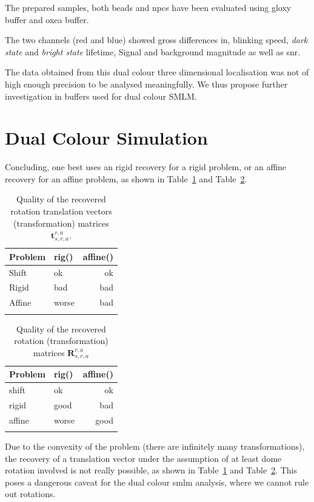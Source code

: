 \documentclass[11pt, a4paper, oneside, twocolumn]{report}
\renewcommand{\b}{\textbf}
\newcommand{\e}{\emph}
\begin{document}
The prepared samples, both beads and \gls{npc}s have been evaluated
using \gls{gloxy} buffer and \gls{oxea} buffer.

The two channels (red and blue) showed gross differences in, blinking
speed, \e{dark state} and \e{bright state} lifetime, Signal and
background magnitude as well as \gls{snr}.

The data obtained from this dual colour three dimensional localisation
was not of high enough precision to be analysed meaningfully. We thus
propose further investigation in buffers used for dual colour SMLM.
  

\section{Dual Colour Simulation}

Concluding, one best uses an rigid recovery for a rigid problem, or an
affine recovery for an affine problem, as shown in Table~\ref{t:t} and
Table~\ref{t:r}.

\begin{table}[!htb]
  \caption{Quality of the recovered rotation translation vectors
    (transformation) matrices $\b{t}_{s,r,a}^{r,a}$.}\label{t:t}
  \begin{tabularx}{.5\textwidth}{X l r}
    \hhline{===}
    Problem & rig() & affine() \\
    \hline
    Shift & ok & ok \\
    Rigid & bad & bad \\
    Affine & worse & bad \\
    \hhline{===}
  \end{tabularx}
\end{table}

\begin{table}[!htb]
  \caption{Quality of the recovered rotation (transformation) matrices
    $\b{R}_{s,r,a}^{r,a}$}\label{t:r}
  \begin{tabularx}{.5\textwidth}{X l r}
    \hhline{===}
    Problem & rig() & affine() \\
    \hline
    shift & ok & ok \\
    rigid & good & bad \\
    affine & worse & good \\
    \hhline{===}
  \end{tabularx}
\end{table}

Due to the convexity of the problem (there are infinitely many
transformations), the recovery of a translation vector under the
assumption of at least dome rotation involved is not really possible,
as shown in Table~\ref{t:t} and Table~\ref{t:r}. This poses a
dangerous caveat for the dual colour \gls{smlm} analysis, where we
cannot rule out rotations.
\end{document}
